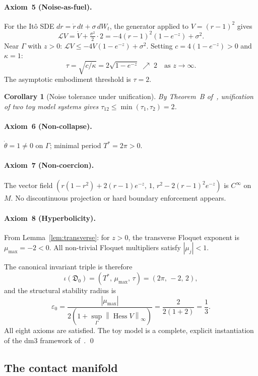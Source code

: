 \documentclass[12pt, oneside]{book}
\theoremstyle{plain}
\newtheorem{corollary}[theorem]{Corollary}
\theoremstyle{definition}
\theoremstyle{remark}
\newcommand{\dm}{\mathfrak{D}}
\newcommand{\Orb}{\Gamma}
\newcommand{\norm}[1]{\left\|#1\right\|}
\newcommand{\abs}[1]{\left|#1\right|}
\DeclareMathOperator{\Hess}{Hess}
\begin{document}
\paragraph{Axiom~5 (Noise-as-fuel).}
For the It\^{o} SDE $dr = \dot r\,dt + \sigma\,dW_t$, the generator
applied to $V=(r-1)^2$ gives
\[
  \mathcal{L}V = \dot V + \tfrac{\sigma^2}{2}\cdot 2
  = -4(r-1)^2(1-e^{-z}) + \sigma^2.
\]
Near $\Orb$ with $z>0$: $\mathcal{L}V \le -4V(1-e^{-z}) + \sigma^2$.
Setting $c=4(1-e^{-z})>0$ and $\kappa=1$:
\[
  \tau = \sqrt{c/\kappa} = 2\sqrt{1-e^{-z}}\;\nearrow\; 2
  \quad\text{as }z\to\infty.
\]
The asymptotic embodiment threshold is $\tau=2$.

\begin{corollary}[Noise tolerance under unification]
By Theorem~B of~\cite{Paper1}, unification of two toy model
systems gives $\tau_{12}\le\min(\tau_1,\tau_2)=2$.
\end{corollary}

\paragraph{Axiom~6 (Non-collapse).}
$\dot\theta=1\ne 0$ on $\Orb$; minimal period $T^*=2\pi>0$.

\paragraph{Axiom~7 (Non-coercion).}
The vector field $(r(1-r^2)+2(r-1)e^{-z},\,1,\,r^2-2(r-1)^2e^{-z})$
is $C^\infty$ on $M$. No discontinuous projection or hard boundary
enforcement appears.

\paragraph{Axiom~8 (Hyperbolicity).}
From Lemma~\ref{lem:transverse}: for $z>0$, the transverse
Floquet exponent is $\mu_{\max}=-2<0$. All non-trivial Floquet
multipliers satisfy $\abs{\mu_j}<1$.

\medskip
The canonical invariant triple is therefore
\[
  \iota(\dm_0) = (T^*,\,\mu_{\max},\,\tau)
  = (2\pi,\,-2,\,2),
\]
and the structural stability radius is
\[
  \varepsilon_0
  = \frac{\abs{\mu_{\max}}}{2(1+\sup_\Orb\norm{\Hess V}_\infty)}
  = \frac{2}{2(1+2)}
  = \frac{1}{3}.
\]
All eight axioms are satisfied. The toy model is a complete, explicit
instantiation of the dm3 framework of~\cite{Paper1}. \qed

\subsection{The contact manifold}
\end{document}
